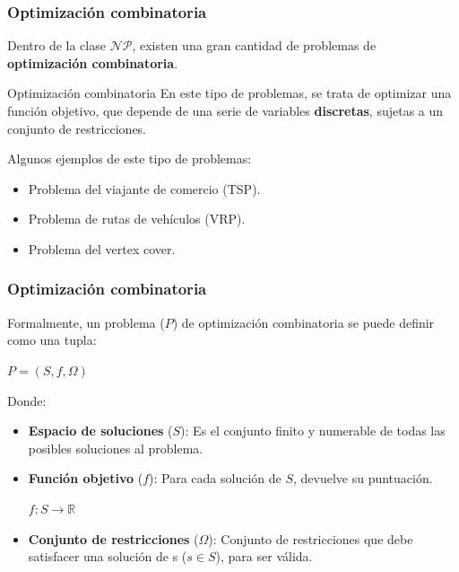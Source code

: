 \documentclass{beamer}
\begin{document}
\begin{frame}
\frametitle{Optimización combinatoria}

Dentro de la clase $\mathcal{NP}$, existen una gran cantidad de problemas de \textbf{optimización combinatoria}.

\bigskip

\begin{block}{Optimización combinatoria}
 En este tipo de problemas, se trata de optimizar una función objetivo, que depende de una serie de variables \textbf{discretas}, sujetas a un conjunto de restricciones.
\end{block}

\bigskip

Algunos ejemplos de este tipo de problemas:

\begin{itemize}
    \item Problema del viajante de comercio (TSP).
    \item Problema de rutas de vehículos (VRP).
    \item Problema del vertex cover.
\end{itemize}
\end{frame}

\begin{frame}
\frametitle{Optimización combinatoria}

Formalmente, un problema ($P$) de optimización combinatoria se puede definir como una tupla:

\begin{center}
    $P = (S, f, \Omega)$
\end{center}

Donde:

\begin{itemize}
    \item \textbf{Espacio de soluciones} ($S$): Es el conjunto finito y numerable de todas las posibles soluciones al problema.
    \item \textbf{Función objetivo} ($f$): Para cada solución de $S$, devuelve su puntuación.
    \begin{center}
        \begin{math}
            f: S \rightarrow \mathbb{R}
        \end{math}
    \end{center}
    \item \textbf{Conjunto de restricciones} ($\Omega$): Conjunto de restricciones que debe satisfacer una solución de s ($s \in S$), para ser válida.
\end{itemize}

\end{frame}
\end{document}

